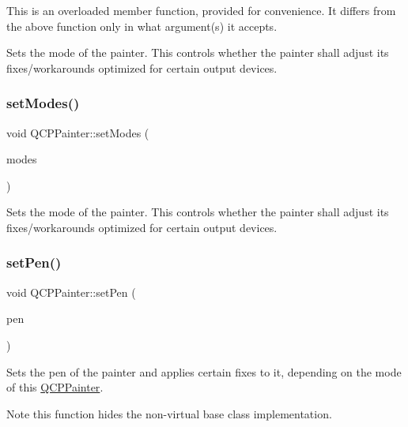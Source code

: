 This is an overloaded member function, provided for convenience. It differs from the above function only in what argument(s) it accepts.

Sets the mode of the painter. This controls whether the painter shall adjust its fixes/workarounds optimized for certain output devices. \hypertarget{class_q_c_p_painter_a5fac93adc29c7c4dea9f3e171e9e635e}{}\label{class_q_c_p_painter_a5fac93adc29c7c4dea9f3e171e9e635e} 
\subsubsection{\texorpdfstring{set\+Modes()}{setModes()}}
{\footnotesize\ttfamily void Q\+C\+P\+Painter\+::set\+Modes (\begin{DoxyParamCaption}\item[{Painter\+Modes}]{modes }\end{DoxyParamCaption})}

Sets the mode of the painter. This controls whether the painter shall adjust its fixes/workarounds optimized for certain output devices. \hypertarget{class_q_c_p_painter_af9c7a4cd1791403901f8c5b82a150195}{}\label{class_q_c_p_painter_af9c7a4cd1791403901f8c5b82a150195} 
\subsubsection{\texorpdfstring{set\+Pen()}{setPen()}\hspace{0.1cm}{\footnotesize\ttfamily [1/3]}}
{\footnotesize\ttfamily void Q\+C\+P\+Painter\+::set\+Pen (\begin{DoxyParamCaption}\item[{const Q\+Pen \&}]{pen }\end{DoxyParamCaption})}

Sets the pen of the painter and applies certain fixes to it, depending on the mode of this \hyperlink{class_q_c_p_painter}{Q\+C\+P\+Painter}.

\begin{DoxyNote}{Note}
this function hides the non-\/virtual base class implementation. 
\end{DoxyNote}
\hypertarget{class_q_c_p_painter_a5c4d88f21564e156e88ef807f7cf0003}{}\label{class_q_c_p_painter_a5c4d88f21564e156e88ef807f7cf0003} 

